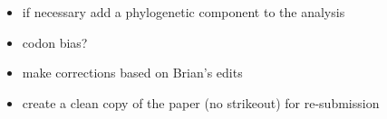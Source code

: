 \documentclass[12pt]{article}
\newcommand{\strep}{\textit{Streptomyces}\xspace}
\begin{document}
\begin{itemize}
%	
%	
%	
	\item if necessary add a phylogenetic component to the analysis
%	
%	
%	
%	
	
	\item codon bias?
	
%	
%	
    
    \item make corrections based on Brian's edits
    
    \item create a clean copy of the paper (no strikeout) for re-submission

	
\end{itemize}
\end{document}
